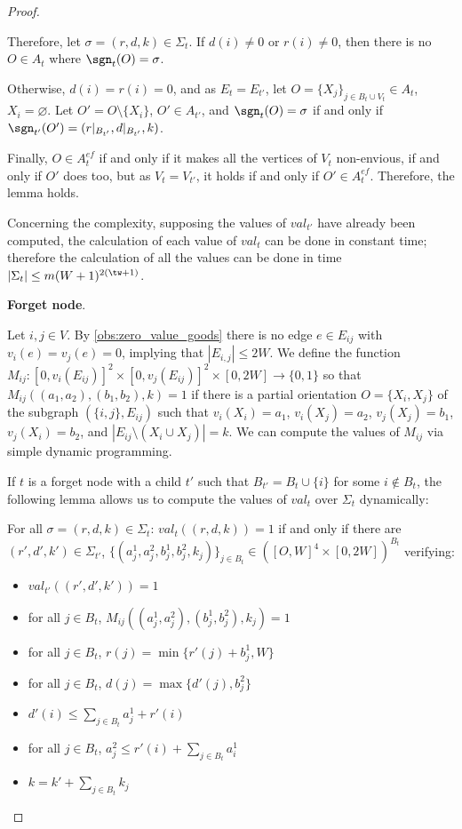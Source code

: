\documentclass[11pt,letterpaper]{article}
\begin{document}
\begin{proof}
\begin{nestedproof}
    Therefore, let $\sigma=(r,d,k)\in \Sigma_t$. If $d(i)\neq 0$ or $r(i)\neq 0$, then there is no $O\in A_t$ where $\sgn_t(O)=\sigma$.

    Otherwise, $d(i)=r(i)=0$, and as $E_t=E_{t'}$, let $O=\{X_j\}_{j\in B_t\cup V_t}\in A_t$, $X_i=\varnothing$. Let $O'=O\setminus\{X_i\}$, $O'\in A_{t'}$, and $\sgn_t(O)=\sigma$ if and only if $\sgn_{t'}(O')=(r|_{B_{t'}},d|_{B_{t'}},k)$.

    Finally, $O\in A_t^{ef}$ if and only if it makes all the vertices of $V_t$ non-envious, if and only if $O'$ does too, but as $V_t=V_{t'}$, it holds if and only if $O'\in A_t^{ef}$. Therefore, the lemma holds.
    \end{nestedproof}

    Concerning the complexity, supposing the values of $val_{t'}$ have already been computed, the calculation of each value of $val_t$ can be done in constant time; therefore the calculation of all the values can be done in time $|\Sigma_t|\leq m(W+1)^{2(\tw +1)}$.
    \medskip

    \textbf{Forget node}.

    Let $i,j \in V$.
    By \cref{obs:zero_value_goods} there is no edge $e \in E_{ij}$ with $v_i(e)=v_j(e)=0$,
    implying that $|E_{i,j}| \leq 2W$.
    We define the function $M_{ij} \colon [ 0,v_i(E_{ij})]^2 \times [0,v_j(E_{ij})]^2\times[0,2W] \to \{0,1\}$
    so that $M_{ij}((a_1,a_2),(b_1,b_2),k)=1$ if there is a partial orientation $O=\{X_i,X_j\}$ of the subgraph $(\{i,j\},E_{ij})$ such that $v_i(X_i)=a_1$, $v_i(X_j)=a_2$, $v_j(X_j)=b_1$, $v_j(X_i)=b_2$, and $|E_{ij}\setminus(X_i\cup X_j)|=k$. We can compute the values of $M_{ij}$ via simple dynamic programming. %


    If $t$ is a forget node with a child $t'$ such that $B_{t'}=B_t\cup \{i\}$ for some $i\notin B_t$, the following lemma allows us to compute the values of $val_t$ over $\Sigma_t$ dynamically:

    \begin{lemma}

    For all $\sigma=(r,d,k)\in\Sigma_t$:
    $val_t((r,d,k))=1$ if and only if there are $(r',d',k')\in \Sigma_{t'}$, $\{(a_j^1,a_j^2,b_j^1,b_j^2,k_j)\}_{j\in B_t}\in ([O,W]^4\times[0,2W])^{B_t}$  verifying:  \begin{itemize}
        \item $val_{t'}((r',d',k'))=1$
        \item for all $j\in B_t$, $M_{ij}((a_j^1,a_j^2),(b_j^1,b_j^2),k_j)=1$
        \item for all $j\in B_t$, $r(j)=\min\{r'(j)+b_j^1,W\}$
        \item for all $j\in B_t$, $d(j)=\max\{d'(j),b_j^2\}$
        \item $d'(i)\leq\sum_{j\in B_t}a_j^1+r'(i)$
        \item for all $j\in B_t$, $a_j^2\leq r'(i)+\sum_{j\in B_t}a_i^1$
        \item $k=k'+\sum_{j\in B_t}k_j$
    \end{itemize}


\end{lemma}
\end{proof}
\end{document}
